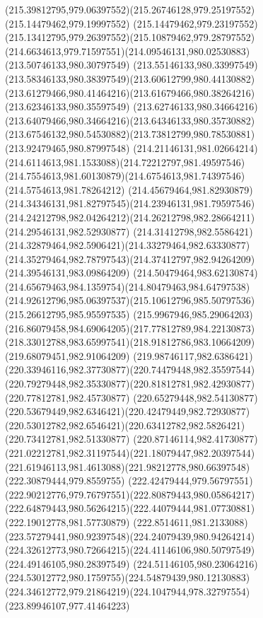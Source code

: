 {{  \curveto(215.39812795,979.06397552)(215.26746128,979.25197552)(215.14479462,979.19997552)
  \curveto(215.14479462,979.23197552)(215.13412795,979.26397552)(215.10879462,979.28797552)
  \curveto(214.6634613,979.71597551)(214.09546131,980.02530883)(213.50746133,980.30797549)
  \curveto(213.55146133,980.33997549)(213.58346133,980.38397549)(213.60612799,980.44130882)
  \curveto(213.61279466,980.41464216)(213.61679466,980.38264216)(213.62346133,980.35597549)
  \curveto(213.62746133,980.34664216)(213.64079466,980.34664216)(213.64346133,980.35730882)
  \curveto(213.67546132,980.54530882)(213.73812799,980.78530881)(213.92479465,980.87997548)
  \curveto(214.21146131,981.02664214)(214.6114613,981.1533088)(214.72212797,981.49597546)
  \curveto(214.7554613,981.60130879)(214.6754613,981.74397546)(214.5754613,981.78264212)
  \curveto(214.45679464,981.82930879)(214.34346131,981.82797545)(214.23946131,981.79597546)
  \curveto(214.24212798,982.04264212)(214.26212798,982.28664211)(214.29546131,982.52930877)
  \curveto(214.31412798,982.5586421)(214.32879464,982.5906421)(214.33279464,982.63330877)
  \curveto(214.35279464,982.78797543)(214.37412797,982.94264209)(214.39546131,983.09864209)
  \curveto(214.50479464,983.62130874)(214.65679463,984.1359754)(214.80479463,984.64797538)
  \curveto(214.92612796,985.06397537)(215.10612796,985.50797536)(215.26612795,985.95597535)
  \curveto(215.9967946,985.29064203)(216.86079458,984.69064205)(217.77812789,984.22130873)
  \curveto(218.33012788,983.65997541)(218.91812786,983.10664209)(219.68079451,982.91064209)
  \curveto(219.98746117,982.6386421)(220.33946116,982.37730877)(220.74479448,982.35597544)
  \curveto(220.79279448,982.35330877)(220.81812781,982.42930877)(220.77812781,982.45730877)
  \curveto(220.65279448,982.54130877)(220.53679449,982.6346421)(220.42479449,982.72930877)
  \curveto(220.53012782,982.6546421)(220.63412782,982.5826421)(220.73412781,982.51330877)
  \curveto(220.87146114,982.41730877)(221.02212781,982.31197544)(221.18079447,982.20397544)
  \curveto(221.61946113,981.4613088)(221.98212778,980.66397548)(222.30879444,979.8559755)
  \curveto(222.42479444,979.56797551)(222.90212776,979.76797551)(222.80879443,980.05864217)
  \curveto(222.64879443,980.56264215)(222.44079444,981.07730881)(222.19012778,981.57730879)
  \curveto(222.8514611,981.2133088)(223.57279441,980.92397548)(224.24079439,980.94264214)
  \curveto(224.32612773,980.72664215)(224.41146106,980.50797549)(224.49146105,980.28397549)
  \curveto(224.51146105,980.23064216)(224.53012772,980.1759755)(224.54879439,980.12130883)
  \curveto(224.34612772,979.21864219)(224.1047944,978.32797554)(223.89946107,977.41464223)
}}
